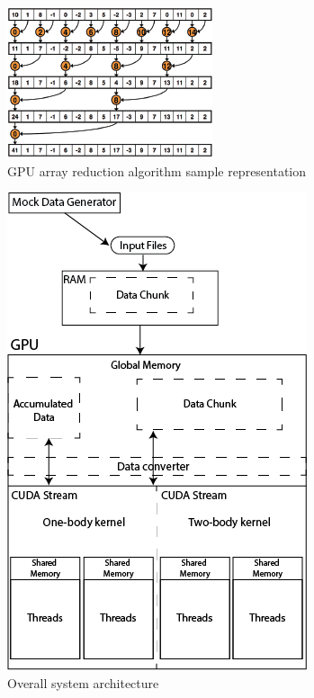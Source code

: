 \documentclass[12pt,letterpaper]{report}
\begin{document}
\begin{figure}
 \centerline{ \includegraphics[width=0.65\columnwidth]{images/reduction} }
 \caption{GPU array reduction algorithm sample representation}
 \label{fg:reduction}
\end{figure}

\begin{figure}
 \centerline{ \includegraphics[width=0.65\columnwidth]{images/overallarchitecture} }
 \caption{Overall system architecture}
 \label{fg:overallarchitecture}
\end{figure}
\end{document}
